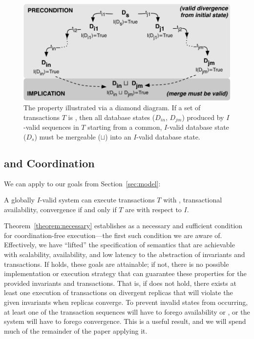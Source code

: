 \begin{figure}
\begin{center}
\includegraphics[width=\columnwidth]{figs/icommute.pdf}\vspace{-1em}
\end{center}
\caption{The \iconfluence property illustrated via a diamond
  diagram. If a set of transactions $T$ is \iconfluent, then all
  database states ($D_{in}$, $D_{jm}$) produced by $I$-valid sequences
  in $T$ starting from a common, $I$-valid database state ($D_s$) must
  be mergeable ($\sqcup$) into an $I$-valid database state.}
\label{fig:iconfluence}
\end{figure}

\subsection{\iconfluence and Coordination}

We can apply \iconfluence to our goals from Section~\ref{sec:model}:

\begin{theorem}
\label{theorem:necessary}
A globally $I$-valid system can execute transactions $T$ with
\cfreedom, transactional availability, convergence if and only if $T$
are \iconfluent with respect to $I$.
\end{theorem}

Theorem~\ref{theorem:necessary} establishes \iconfluence as a
necessary and sufficient condition for coordination-free
execution---the first such condition we are aware of. Effectively, we
have ``lifted'' the specification of semantics that are achievable
with scalability, availability, and low latency to the abstraction of
invariants and transactions. If \iconfluence holds, these goals are
attainable; if not, there is no possible implementation or execution
strategy that can guarantee these properties for the provided
invariants and transactions. That is, if \iconfluence does not hold,
there exists at least one execution of transactions on divergent
replicas that will violate the given invariants when replicas
converge. To prevent invalid states from occurring, at least one of
the transaction sequences will have to forego availability or
\cfreedom, or the system will have to forego convergence. This is a
useful result, and we will spend much of the remainder of the paper
applying it.


